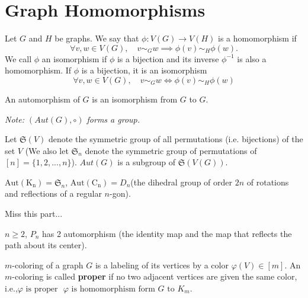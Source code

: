 \section{Graph Homomorphisms}
\begin{definition}
Let $G$ and $H$ be graphs. We say that $\phi:V(G)\to V(H)$ is a homomorphism if
\[ \forall v,w\in V(G), \quad v\sim_{G} w\implies \phi(v)\sim_{H} \phi(w). \]
We call $\phi$ an isomorphism if $\phi$ is a bijection and its inverse $\phi^{-1}$ is also a homomorphism.
If \(\phi\) is a bijection, it is an isomorphism \iff
\[ \forall v,w\in V(G),\quad v\sim_{G} w \Longleftrightarrow \phi(v)\sim_{H} \phi(w) \]
\end{definition}
\begin{definition}[Automorphism]
An automorphism of $G$ is an isomorphism from $G$ to $G$.

\textit{Note: $(Aut(G), \circ)$ forms a group.}
\end{definition}

Let $\mathfrak{S}(V)$ denote the symmetric group of all permutations (i.e. bijections) of the set $V$ (We also let $\mathfrak{S}_n$ denote the symmetric group of permutations of $[n]=\{ 1,2,...,n \}$). $Aut(G)$ is a subgroup of $\mathfrak{S}(V(G))$.

\begin{example}
$\mathrm{Aut(K_n)} = \mathfrak{S}_n$,
$\mathrm{Aut(C_n)} = D_n$(the dihedral group of order $2n$ of rotations and reflections of a regular $n$-gon).
\end{example}

\begin{theorem}
Miss this part...
\end{theorem}

\begin{example}
$n\geq 2$, $P_n$ has 2 automorphism (the identity map and the map that reflects the path about its center).
\end{example}

\begin{definition}[\(m\)-coloring]
\(m\)-coloring of a graph $G$ is a labeling of its vertices by a color $\varphi(V) \in [m]$.
An \(m\)-coloring is called \textbf{proper} if no two adjacent vertices are given the same color, i.e.,\(\varphi \text{ is proper }\) \iff \(\varphi\text{ is homomorphism form }G \text{ to }K_m\).
\end{definition}

